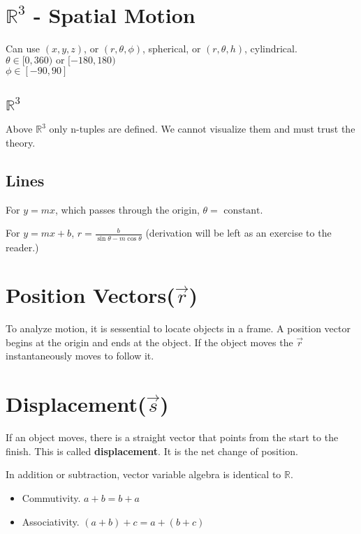 \documentclass[letterpaper]{article}
\begin{document}
\section{$\mathbb{R}^3$ - Spatial Motion}
Can use $(x, y, z)$, or $(r, \theta, \phi)$, spherical, or $(r, \theta, h)$, cylindrical.\\
$\theta \in [0, 360) \textrm{ or } [-180, 180)$\\
$\phi \in [-90, 90]$\\

\subsection{$\mathbb{R}^3$}
Above $\mathbb{R}^3$ only n-tuples are defined. We cannot visualize them and
must trust the theory. 

\subsection{Lines}

For $y = mx$, which passes through the origin, $\theta =\textrm{ constant}$.

For $y = mx + b$, $r = \frac{b}{\sin{\theta} - m\cos{\theta}}$ (derivation will
be left as an exercise to the reader.)

\section{Position Vectors($\vec{r}$)}
To analyze motion, it is sessential to locate objects in a frame. A position
vector begins at the origin and ends at the object. If the object moves
 the $\vec{r}$ instantaneously moves to follow it.

\section{Displacement($\vec{s}$)}
If an object moves, there is a straight vector that points from the start to the
finish. This is called {\bf displacement}. It is the net change of position.

In addition or subtraction, vector variable algebra is identical to $\mathbb{R}$.

\begin{itemize}
    \item Commutivity. $a + b = b + a$
    \item Associativity. $(a + b) + c = a + (b + c)$
\end{itemize}
\end{document}
